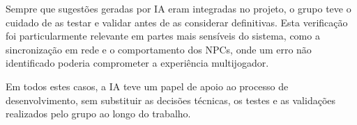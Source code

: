 Sempre que sugestões geradas por IA eram integradas no projeto, o grupo teve o cuidado de as testar e validar antes de as considerar definitivas. Esta verificação foi particularmente relevante em partes mais sensíveis do sistema, como a sincronização em rede e o comportamento dos NPCs, onde um erro não identificado poderia comprometer a experiência multijogador.

Em todos estes casos, a IA teve um papel de apoio ao processo de desenvolvimento, sem substituir as decisões técnicas, os testes e as validações realizados pelo grupo ao longo do trabalho.
